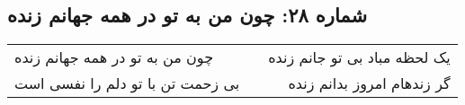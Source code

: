 \begin{center}
\section*{شماره ۲۸: چون من به تو در همه جهانم زنده}
\label{sec:028}
\begin{longtable}{l p{0.5cm} r}
چون من به تو در همه جهانم زنده
&&
یک لحظه مباد بی تو جانم زنده
\\
بی زحمت تن با تو دلم را نفسی است
&&
گر زندهام امروز بدانم زنده
\\
\end{longtable}
\end{center}
